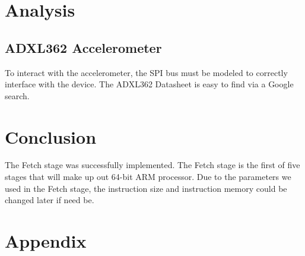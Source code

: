 \documentclass{article}
\newcommand{\Verilog}[3]{
  \lstset{language=Verilog}
  \lstset{backgroundcolor=\color{listinggray},rulecolor=\color{blue}}
  \lstset{linewidth=\textwidth}
  \lstset{commentstyle=\textit, stringstyle=\upshape,showspaces=false}
  \lstset{frame=tb}
  
}
\begin{document}
\section{Analysis}
\subsection{ADXL362 Accelerometer}
To interact with the accelerometer, the SPI bus must be modeled to correctly interface with the device. The ADXL362 Datasheet is easy to find via a Google search. 
%
%

\section{Conclusion}
The Fetch stage was successfully implemented. The Fetch stage is the first of five stages that will make up out 64-bit ARM processor. Due to the parameters we used in the Fetch stage, the instruction size and instruction memory could be changed later if need be. 

\section{Appendix}
\end{document}
